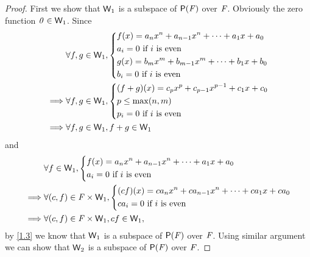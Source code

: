 \begin{proof}
  First we show that \(\mathsf{W}_1\) is a subspace of \(\ps{\F}\) over \(\mathit{F}\).
  Obviously the zero function \(\mathit{0} \in \mathsf{W}_1\).
  Since
  \begin{align*}
             & \forall f, g \in \mathsf{W}_1, \begin{dcases}
      f(x) = a_n x^n + a_{n - 1} x^n + \cdots + a_1 x + a_0 \\
      a_i = 0 \text{ if } i \text{ is even}                 \\
      g(x) = b_m x^m + b_{m - 1} x^m + \cdots + b_1 x + b_0 \\
      b_i = 0 \text{ if } i \text{ is even}
    \end{dcases} \\
    \implies & \forall f, g \in \mathsf{W}_1, \begin{dcases}
      (f + g)(x) = c_p x^p + c_{p - 1} x^{p - 1} + c_1 x + c_0 \\
      p \leq \max(n, m)                                        \\
      p_i = 0 \text{ if } i \text{ is even}
    \end{dcases} \\
    \implies & \forall f, g \in \mathsf{W}_1, f + g \in \mathsf{W}_1
  \end{align*}
  and
  \begin{align*}
             & \forall f \in \mathsf{W}_1, \begin{dcases}
      f(x) = a_n x^n + a_{n - 1} x^n + \cdots + a_1 x + a_0 \\
      a_i = 0 \text{ if } i \text{ is even}
    \end{dcases}                \\
    \implies & \forall (c, f) \in \mathit{F} \times \mathsf{W}_1, \begin{dcases}
      (cf)(x) = ca_n x^n + ca_{n - 1} x^n + \cdots + ca_1 x + ca_0 \\
      ca_i = 0 \text{ if } i \text{ is even}
    \end{dcases} \\
    \implies & \forall (c, f) \in \mathit{F} \times \mathsf{W}_1, cf \in \mathsf{W}_1,
  \end{align*}
  by \cref{1.3} we know that \(\mathsf{W}_1\) is a subspace of \(\ps{\F}\) over \(\mathit{F}\).
  Using similar argument we can show that \(\mathsf{W}_2\) is a subspace of \(\ps{\F}\) over \(\mathit{F}\).


\end{proof}
